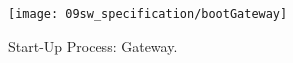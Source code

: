 \begin{figure}[H]
	\centering
	\texttt{[image: 09sw\_specification/bootGateway]}
	\caption{Start-Up Process: Gateway.}
	\label{fig:bootGateway}
\end{figure}

